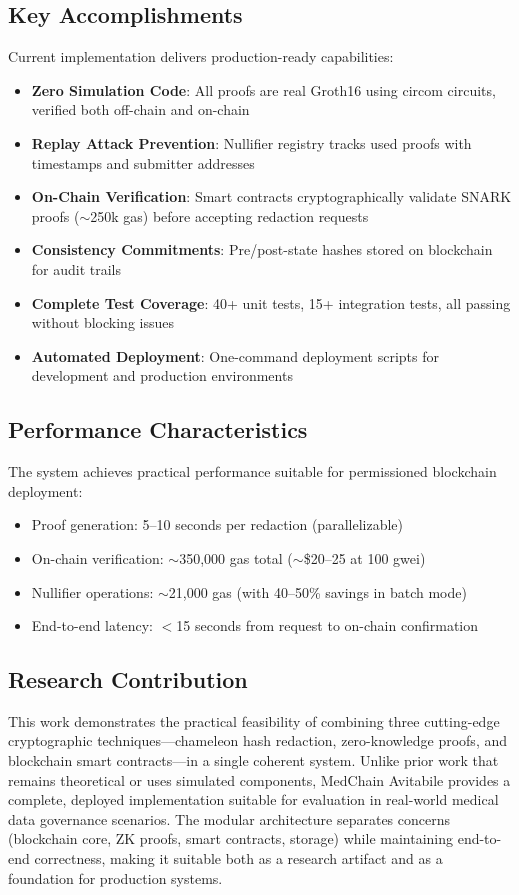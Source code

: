 \subsection{Key Accomplishments}

Current implementation delivers production-ready capabilities:
\begin{itemize}
    \item \textbf{Zero Simulation Code}: All proofs are real Groth16 using circom circuits, verified both off-chain and on-chain
    \item \textbf{Replay Attack Prevention}: Nullifier registry tracks used proofs with timestamps and submitter addresses
    \item \textbf{On-Chain Verification}: Smart contracts cryptographically validate SNARK proofs ($\sim$250k gas) before accepting redaction requests
    \item \textbf{Consistency Commitments}: Pre/post-state hashes stored on blockchain for audit trails
    \item \textbf{Complete Test Coverage}: 40+ unit tests, 15+ integration tests, all passing without blocking issues
    \item \textbf{Automated Deployment}: One-command deployment scripts for development and production environments
\end{itemize}

\subsection{Performance Characteristics}

The system achieves practical performance suitable for permissioned blockchain deployment:
\begin{itemize}
    \item Proof generation: 5--10 seconds per redaction (parallelizable)
    \item On-chain verification: $\sim$350,000 gas total ($\sim$\$20--25 at 100 gwei)
    \item Nullifier operations: $\sim$21,000 gas (with 40--50\% savings in batch mode)
    \item End-to-end latency: $<$15 seconds from request to on-chain confirmation
\end{itemize}

\subsection{Research Contribution}

This work demonstrates the practical feasibility of combining three cutting-edge cryptographic techniques---chameleon hash redaction, zero-knowledge proofs, and blockchain smart contracts---in a single coherent system. Unlike prior work that remains theoretical or uses simulated components, MedChain Avitabile provides a complete, deployed implementation suitable for evaluation in real-world medical data governance scenarios. The modular architecture separates concerns (blockchain core, ZK proofs, smart contracts, storage) while maintaining end-to-end correctness, making it suitable both as a research artifact and as a foundation for production systems.
